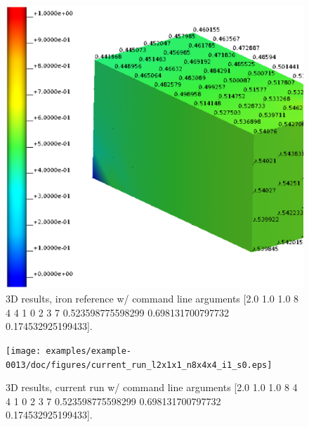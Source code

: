\begin{figure}[h!]
    \centering 
    \includegraphics[width=0.9\columnwidth]{examples/example-0013/doc/figures/iron_reference_3D.eps} 
    \caption{3D results, iron reference w/ command line arguments [2.0 1.0 1.0 8 4 4 1 0 2 3 7 0.523598775598299 0.698131700797732 0.174532925199433].}
    \label{example-0013-iron-3D-reference-fig}
\end{figure}
%
\begin{figure}[h!]
    \centering 
    \texttt{[image: examples/example-0013/doc/figures/current\_run\_l2x1x1\_n8x4x4\_i1\_s0.eps]} 
    \caption{3D results, current run w/ command line arguments [2.0 1.0 1.0 8 4 4 1 0 2 3 7 0.523598775598299 0.698131700797732 0.174532925199433].}
    \label{example-0013-current-run-3D-fig}
\end{figure}
%
